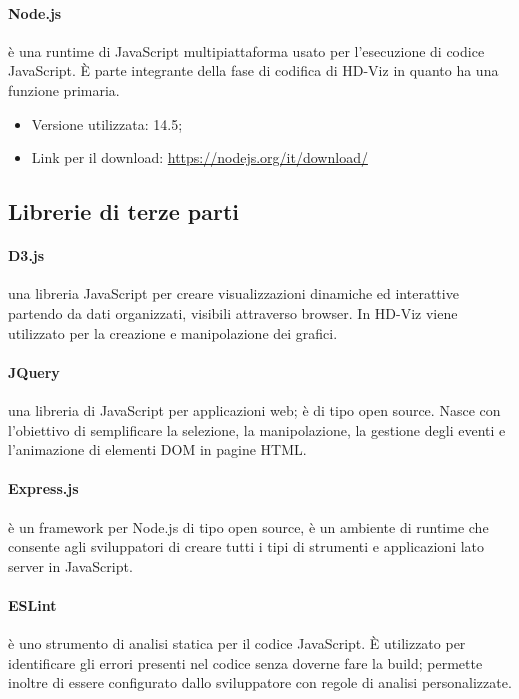 \documentclass[../manuale_sviluppatore.tex]{subfiles}
\begin{document}
\paragraph{Node.js}
 è una runtime di JavaScript  multipiattaforma usato per l’esecuzione di codice JavaScript.  
È parte integrante della fase di codifica di HD-Viz in quanto ha una funzione primaria.\\
\begin{itemize}
    \item Versione utilizzata: 14.5;
    \item Link per il download: \url{https://nodejs.org/it/download/}
\end{itemize}



\subsection{Librerie di terze parti}

\paragraph{D3.js}
 una libreria JavaScript per creare visualizzazioni dinamiche ed interattive partendo da dati organizzati, visibili attraverso browser. 
In HD-Viz viene utilizzato per la creazione e manipolazione dei grafici.

\paragraph{JQuery}
 una libreria di JavaScript per applicazioni web; è di tipo open source. Nasce con l'obiettivo di semplificare la selezione, la manipolazione, la gestione degli eventi e l'animazione di elementi DOM in pagine HTML.

\paragraph{Express.js}
 è un framework per Node.js di tipo open source, è un ambiente di runtime che consente agli sviluppatori di creare tutti i tipi di strumenti e applicazioni lato server in JavaScript.

\paragraph{ESLint}
 è uno strumento di analisi statica per il codice JavaScript. È utilizzato per identificare gli errori presenti nel codice senza doverne fare la build; 
permette inoltre di essere configurato dallo sviluppatore con regole di analisi personalizzate.
\end{document}
